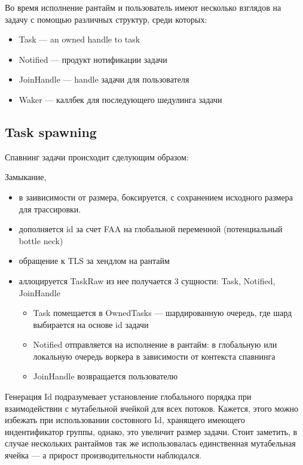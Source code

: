 Во время исполнение рантайм и пользователь имеют несколько взглядов на задачу с помощью различных структур, среди которых:

\begin{itemize}
    \item Task --- an owned handle to task
    \item Notified --- продукт нотификации задачи
    \item JoinHandle --- handle задачи для пользователя
    \item Waker --- каллбек для последующего шедулинга задачи
\end{itemize}

\subsection{Task spawning}

Спавнинг задачи происходит сделующим образом:

Замыкание,
\begin{itemize}
    \item в заивисимости от размера, боксируется, с сохранением исходного размера для трассировки.
    \item дополняется id за счет FAA на глобальной переменной (потенциальный bottle neck)
    \item обращение к TLS за хендлом на рантайм
    \item аллоцируется TaskRaw из нее получается 3 сущности: Task, Notified, JoinHandle
    \begin{itemize}
        \item Task помещается в OwnedTasks --- шардированную очередь, где шард выбирается на основе id задачи
        \item Notified отправляется на исполнение в рантайм: в глобальную или локальную очередь воркера в зависимости от контекста спавнинга
        \item JoinHandle возвращается пользователю
    \end{itemize}
\end{itemize}

Генерация Id подразумевает установление глобального порядка при взаимодействии с мутабельной ячейкой для всех потоков. Кажется, этого можно избежать при использовании состовного Id, хранящего имеющего индентификатор группы, однако, это увеличит размер задачи. Стоит заметить, в случае нескольких рантаймов так же использовалась единственная мутабельная ячейка --- а прирост производительности наблюдался.

